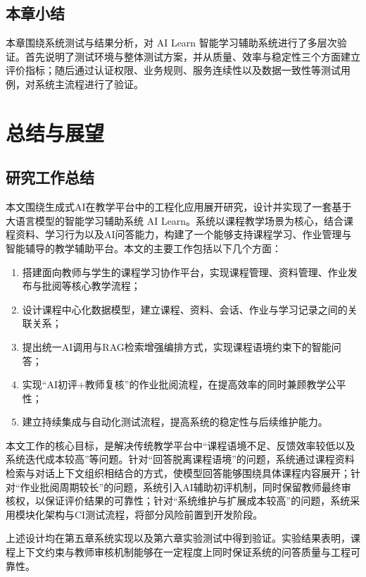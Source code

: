\documentclass[12pt,a4paper,oneside]{ctexbook}
\numberwithin{equation}{chapter}
\begin{document}
\section{本章小结}

本章围绕系统测试与结果分析，对 AI Learn 智能学习辅助系统进行了多层次验证。首先说明了测试环境与整体测试方案，并从质量、效率与稳定性三个方面建立评价指标；随后通过认证权限、业务规则、服务连续性以及数据一致性等测试用例，对系统主流程进行了验证。

\chapter{总结与展望}

\section{研究工作总结}

本文围绕生成式AI在教学平台中的工程化应用展开研究，设计并实现了一套基于大语言模型的智能学习辅助系统 AI Learn。系统以课程教学场景为核心，结合课程资料、学习行为以及AI问答能力，构建了一个能够支持课程学习、作业管理与智能辅导的教学辅助平台。本文的主要工作包括以下几个方面：

\begin{enumerate}[label=(\arabic*)]
  \item 搭建面向教师与学生的课程学习协作平台，实现课程管理、资料管理、作业发布与批阅等核心教学流程；
  \item 设计课程中心化数据模型，建立课程、资料、会话、作业与学习记录之间的关联关系；
  \item 提出统一AI调用与RAG检索增强编排方式，实现课程语境约束下的智能问答；
  \item 实现“AI初评+教师复核”的作业批阅流程，在提高效率的同时兼顾教学公平性；
  \item 建立持续集成与自动化测试流程，提高系统的稳定性与后续维护能力。
\end{enumerate}

本文工作的核心目标，是解决传统教学平台中“课程语境不足、反馈效率较低以及系统迭代成本较高”等问题。针对“回答脱离课程语境”的问题，系统通过课程资料检索与对话上下文组织相结合的方式，使模型回答能够围绕具体课程内容展开；针对“作业批阅周期较长”的问题，系统引入AI辅助初评机制，同时保留教师最终审核权，以保证评价结果的可靠性；针对“系统维护与扩展成本较高”的问题，系统采用模块化架构与CI测试流程，将部分风险前置到开发阶段。

上述设计均在第五章系统实现以及第六章实验测试中得到验证。实验结果表明，课程上下文约束与教师审核机制能够在一定程度上同时保证系统的问答质量与工程可靠性。
\end{document}
